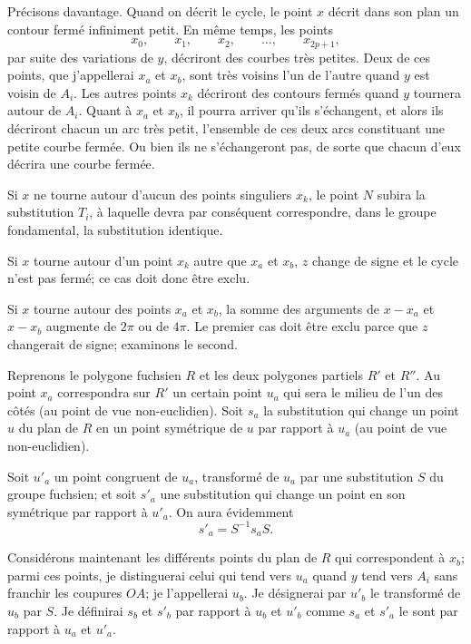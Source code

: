 \documentclass{article}
\begin{document}
Précisons davantage. Quand on décrit le cycle, le point $x$ décrit dans son plan un contour fermé infiniment petit. En même temps, les points
\[ x_{0}, \qquad x_{1}, \qquad x_{2}, \qquad \ldots, \qquad x_{2p+1}, \]
par suite des variations de $y$, décriront des courbes très petites. Deux de ces points, que j'appellerai $x_{a}$ et $x_{b}$, sont très voisins l'un de l'autre quand $y$ est voisin de $A_{i}$. Les autres points $x_{k}$ décriront des contours fermés quand $y$ tournera autour de $A_{i}$. Quant à $x_{a}$ et $x_{b}$, il pourra arriver qu'ils s'échangent, et alors ils décriront chacun un arc très petit, l'ensemble de ces deux arcs constituant une petite courbe fermée. Ou bien ils ne s'échangeront pas, de sorte que chacun d'eux décrira une courbe fermée.


Si $x$ ne tourne autour d'aucun des points singuliers $x_{k}$, le point $N$ subira la substitution $T_{i}$, à laquelle devra par conséquent correspondre, dans le groupe fondamental, la substitution identique.

Si $x$ tourne autour d'un point $x_{k}$ autre que $x_{a}$ et $x_{b}$, $z$ change de signe et le cycle n'est pas fermé; ce cas doit donc être exclu.

Si $x$ tourne autour des points $x_{a}$ et $x_{b}$, la somme des arguments de $x - x_{a}$ et $x - x_{b}$ augmente de $2\pi$ ou de $4\pi$. Le premier cas doit être exclu parce que $z$ changerait de signe; examinons le second.

Reprenons le polygone fuchsien $R$ et les deux polygones partiels $R'$ et $R''$. Au point $x_{a}$ correspondra sur $R'$ un certain point $u_{a}$ qui sera le milieu de l'un des côtés (au point de vue non-euclidien). Soit $s_{a}$ la substitution qui change un point $u$ du plan de $R$ en un point symétrique de $u$ par rapport à $u_{a}$ (au point de vue non-euclidien).

Soit $u'_{a}$ un point congruent de $u_{a}$, transformé de $u_{a}$ par une substitution $S$ du groupe fuchsien; et soit $s'_{a}$ une substitution qui change un point en son symétrique par rapport à $u'_{a}$. On aura évidemment
\[ s'_{a} = S^{-1} s_{a} S. \]

Considérons maintenant les différents points du plan de $R$ qui correspondent à $x_{b}$; parmi ces points, je distinguerai celui qui tend vers $u_{a}$ quand $y$ tend vers $A_{i}$ sans franchir les coupures $OA$; je l'appellerai $u_{b}$. Je désignerai par $u'_{b}$ le transformé de $u_{b}$ par $S$. Je définirai $s_{b}$ et $s'_{b}$ par rapport à $u_{b}$ et $u'_{b}$ comme $s_{a}$ et $s'_{a}$ le sont par rapport à $u_{a}$ et $u'_{a}$.
\end{document}
